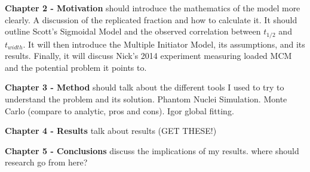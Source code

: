 	\textbf{Chapter 2 - Motivation}
	should introduce the mathematics of the model more clearly.
	A discussion of the replicated fraction and how to calculate it.
	It should outline Scott's Sigmoidal Model and the observed correlation between $t_{1/2}$ and $t_{width}$.
	It will then introduce the Multiple Initiator Model, its assumptions, and its results.
	Finally, it will discuss Nick's 2014 experiment measuring loaded MCM and the potential problem it points to.
	
	\textbf{Chapter 3 - Method}
	should talk about the different tools I used to try to understand the problem and its solution.
	Phantom Nuclei Simulation.
	Monte Carlo (compare to analytic, pros and cons).
	Igor global fitting.
	
	\textbf{Chapter 4 - Results}
	talk about results (GET THESE!)
	
	\textbf{Chapter 5 - Conclusions}
	discuss the implications of my results.
	where should research go from here?
		
		
		
		
		
		
		
		
		
		